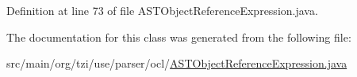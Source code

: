 Definition at line 73 of file A\-S\-T\-Object\-Reference\-Expression.\-java.



The documentation for this class was generated from the following file\-:\begin{DoxyCompactItemize}
\item 
src/main/org/tzi/use/parser/ocl/\hyperlink{_a_s_t_object_reference_expression_8java}{A\-S\-T\-Object\-Reference\-Expression.\-java}\end{DoxyCompactItemize}
